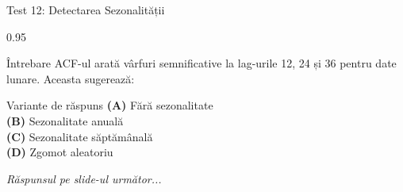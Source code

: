 \documentclass[9pt, aspectratio=169, t]{beamer}
\begin{document}
\begin{frame}{Test 12: Detectarea Sezonalității}
    \begin{cminipage}{0.95\textwidth}
    \begin{alertblock}{Întrebare}
        ACF-ul arată vârfuri semnificative la lag-urile 12, 24 și 36 pentru date lunare. Aceasta sugerează:
    \end{alertblock}

    \vspace{0.4cm}

    \begin{block}{Variante de răspuns}
    \textcolor{MainBlue}{\textbf{(A)}} Fără sezonalitate\\[3pt]
    \textcolor{MainBlue}{\textbf{(B)}} Sezonalitate anuală\\[3pt]
    \textcolor{MainBlue}{\textbf{(C)}} Sezonalitate săptămânală\\[3pt]
    \textcolor{MainBlue}{\textbf{(D)}} Zgomot aleatoriu
    \end{block}
    \vspace{0.5cm}

    \begin{center}
        \textit{Răspunsul pe slide-ul următor...}
    \end{center}
    \end{cminipage}
\end{frame}
\end{document}
